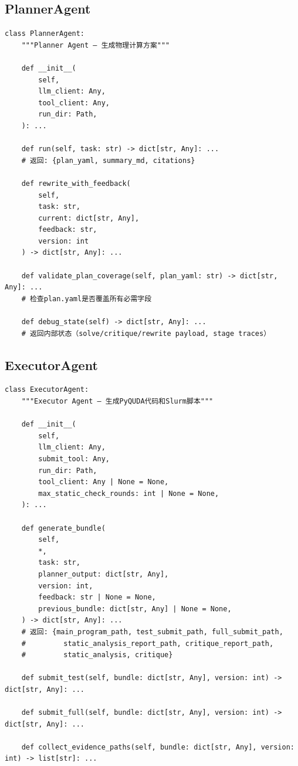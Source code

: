 \documentclass[12pt,a4paper]{ctexart}
\begin{document}
\subsection{PlannerAgent}

\begin{lstlisting}[caption={PlannerAgent 接口}]
class PlannerAgent:
    """Planner Agent — 生成物理计算方案"""

    def __init__(
        self,
        llm_client: Any,
        tool_client: Any,
        run_dir: Path,
    ): ...

    def run(self, task: str) -> dict[str, Any]: ...
    # 返回: {plan_yaml, summary_md, citations}

    def rewrite_with_feedback(
        self,
        task: str,
        current: dict[str, Any],
        feedback: str,
        version: int
    ) -> dict[str, Any]: ...

    def validate_plan_coverage(self, plan_yaml: str) -> dict[str, Any]: ...
    # 检查plan.yaml是否覆盖所有必需字段

    def debug_state(self) -> dict[str, Any]: ...
    # 返回内部状态（solve/critique/rewrite payload, stage traces）
\end{lstlisting}

\subsection{ExecutorAgent}

\begin{lstlisting}[caption={ExecutorAgent 接口}]
class ExecutorAgent:
    """Executor Agent — 生成PyQUDA代码和Slurm脚本"""

    def __init__(
        self,
        llm_client: Any,
        submit_tool: Any,
        run_dir: Path,
        tool_client: Any | None = None,
        max_static_check_rounds: int | None = None,
    ): ...

    def generate_bundle(
        self,
        *,
        task: str,
        planner_output: dict[str, Any],
        version: int,
        feedback: str | None = None,
        previous_bundle: dict[str, Any] | None = None,
    ) -> dict[str, Any]: ...
    # 返回: {main_program_path, test_submit_path, full_submit_path,
    #         static_analysis_report_path, critique_report_path,
    #         static_analysis, critique}

    def submit_test(self, bundle: dict[str, Any], version: int) -> dict[str, Any]: ...

    def submit_full(self, bundle: dict[str, Any], version: int) -> dict[str, Any]: ...

    def collect_evidence_paths(self, bundle: dict[str, Any], version: int) -> list[str]: ...
\end{lstlisting}
\end{document}
